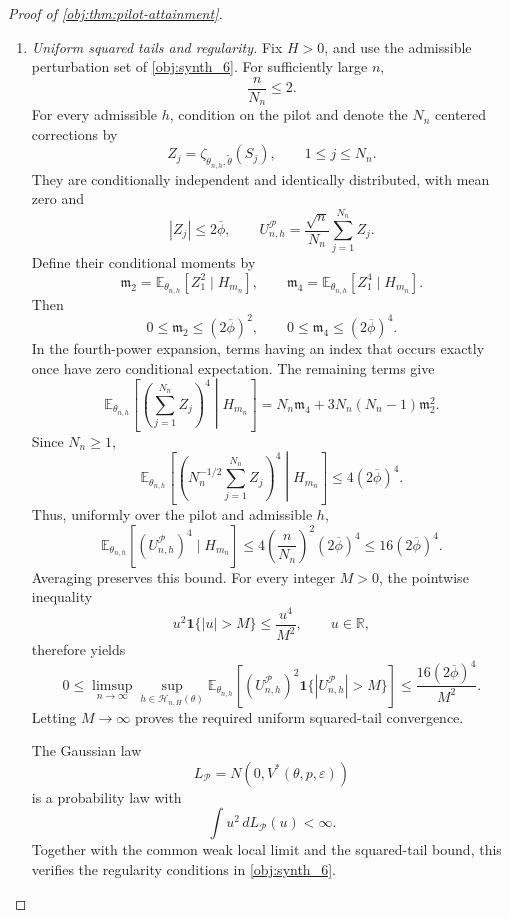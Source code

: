 \documentclass[11pt]{article}
\begin{document}
\begin{proof}[Proof of \cref{obj:thm:pilot-attainment}]
\begin{enumerate}
\item \emph{Uniform squared tails and regularity.}
Fix \(H>0\), and use the admissible perturbation set of \cref{obj:synth_6}. For sufficiently large \(n\),
\[
\frac n{N_n}\le2.
\]
For every admissible \(h\), condition on the pilot and denote the \(N_n\) centered corrections by
\[
Z_j=\zeta_{\theta_{n,h},\widetilde\theta}(S_j),
\qquad 1\le j\le N_n.
\]
They are conditionally independent and identically distributed, with mean zero and
\[
|Z_j|\le2\overline\phi,
\qquad
U_{n,h}^{\mathcal P}
=\frac{\sqrt n}{N_n}\sum_{j=1}^{N_n}Z_j.
\]
Define their conditional moments by
\[
\mathfrak m_2=\mathbb E_{\theta_{n,h}}[Z_1^2\mid H_{m_n}],
\qquad
\mathfrak m_4=\mathbb E_{\theta_{n,h}}[Z_1^4\mid H_{m_n}].
\]
Then
\[
0\le\mathfrak m_2\le(2\overline\phi)^2,
\qquad
0\le\mathfrak m_4\le(2\overline\phi)^4.
\]
In the fourth-power expansion, terms having an index that occurs exactly once have zero conditional expectation. The remaining terms give
\[
\mathbb E_{\theta_{n,h}}
\left[\left(\sum_{j=1}^{N_n}Z_j\right)^4\middle|H_{m_n}\right]
=
N_n\mathfrak m_4+3N_n(N_n-1)\mathfrak m_2^2.
\]
Since \(N_n\ge1\),
\[
\mathbb E_{\theta_{n,h}}
\left[\left(N_n^{-1/2}\sum_{j=1}^{N_n}Z_j\right)^4
\middle|H_{m_n}\right]
\le4(2\overline\phi)^4.
\]
Thus, uniformly over the pilot and admissible \(h\),
\[
\mathbb E_{\theta_{n,h}}
[(U_{n,h}^{\mathcal P})^4\mid H_{m_n}]
\le
4\left(\frac n{N_n}\right)^2(2\overline\phi)^4
\le16(2\overline\phi)^4.
\]
Averaging preserves this bound. For every integer \(M>0\), the pointwise inequality
\[
u^2\mathbf1\{|u|>M\}\le\frac{u^4}{M^2},
\qquad u\in\mathbb R,
\]
therefore yields
\[
0\le
\limsup_{n\to\infty}
\sup_{h\in\mathcal H_{n,H}(\theta)}
\mathbb E_{\theta_{n,h}}
\left[(U_{n,h}^{\mathcal P})^2
\mathbf1\{|U_{n,h}^{\mathcal P}|>M\}\right]
\le\frac{16(2\overline\phi)^4}{M^2}.
\]
Letting \(M\to\infty\) proves the required uniform squared-tail convergence.

The Gaussian law
\[
L_{\mathcal P}=N(0,V^*(\theta,p,\varepsilon))
\]
is a probability law with
\[
\int u^2\,dL_{\mathcal P}(u)<\infty.
\]
Together with the common weak local limit and the squared-tail bound, this verifies the regularity conditions in \cref{obj:synth_6}.


\end{enumerate}
\end{proof}
\end{document}
